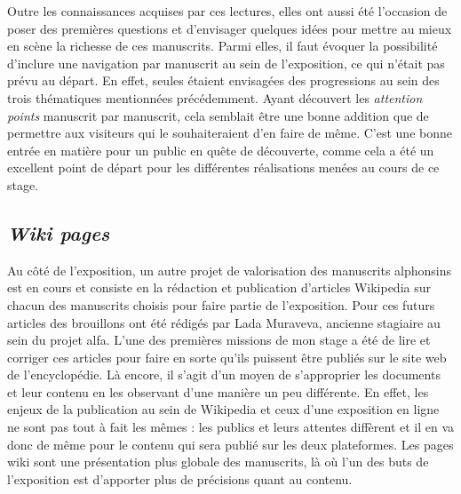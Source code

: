 	Outre les connaissances acquises par ces lectures, elles ont aussi été l’occasion de poser des premières questions et d’envisager quelques idées pour mettre au mieux en scène la richesse de ces manuscrits. Parmi elles, il faut évoquer la possibilité d'inclure une navigation par manuscrit au sein de l'exposition, ce qui n'était pas prévu au départ. En effet, seules étaient envisagées des progressions au sein des trois thématiques mentionnées précédemment. Ayant découvert les \textit{attention points} manuscrit par manuscrit, cela semblait être une bonne addition que de permettre aux visiteurs qui le souhaiteraient d'en faire de même. C'est une bonne entrée en matière pour un public en quête de découverte, comme cela a été un excellent point de départ pour les différentes réalisations menées au cours de ce stage. 

	
	\subsection{\textit{Wiki pages}}
	Au côté de l'exposition, un autre projet de valorisation des manuscrits alphonsins est en cours et consiste en la rédaction et publication d'articles Wikipedia sur chacun des manuscrits choisis pour faire partie de l'exposition. Pour ces futurs articles des brouillons ont été rédigés par Lada Muraveva, ancienne stagiaire au sein du projet \acrshort{alfa}. L'une des premières missions de mon stage a été de lire et corriger ces articles pour faire en sorte qu'ils puissent être publiés sur le site web de l'encyclopédie. Là encore, il s'agit d'un moyen de s'approprier les documents et leur contenu en les observant d'une manière un peu différente. En effet, les enjeux de la publication au sein de Wikipedia et ceux d'une exposition en ligne ne sont pas tout à fait les mêmes : les publics et leurs attentes diffèrent et il en va donc de même pour le contenu qui sera publié sur les deux plateformes. Les pages wiki sont une présentation plus globale des manuscrits, là où l'un des buts de l'exposition est d'apporter plus de précisions quant au contenu. 
	
